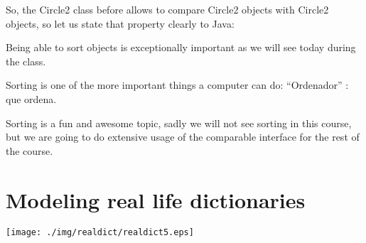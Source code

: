 \documentclass[a4paper, 9pt]{extarticle}
\begin{document}
So, the Circle2 class before allows to compare Circle2 objects with Circle2
objects, so let us state that property clearly to Java:


Being able to sort objects is exceptionally important as we will see today during the class.

Sorting is one of the more important things a computer can do: ``Ordenador'' : que ordena.

Sorting is a fun and awesome topic, sadly we will not see sorting in this course, but
we are going to do extensive usage of the comparable interface for the rest of
the course.

\newpage

\section{Modeling real life dictionaries}

\begin{center}
  \texttt{[image: ./img/realdict/realdict5.eps]}
\end{center}
\end{document}
